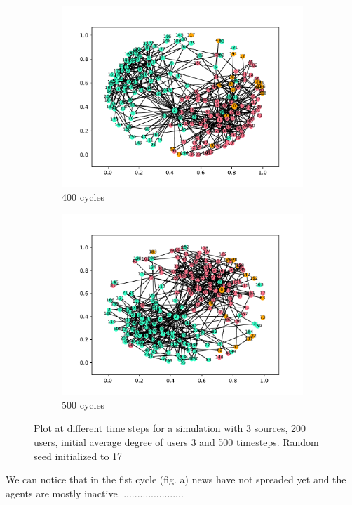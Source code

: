 \begin{figure}
  \begin{subfigure}[t]{.45\textwidth}
    \centering
    \includegraphics[trim={1cm .5cm 1cm 1cm}, clip, width=\linewidth]{img/pdf/plot-0400.pdf} 
    \caption{400 cycles} \label{fig:300}
  \end{subfigure}
  \begin{subfigure}[t]{.45\textwidth}
    \centering
    \includegraphics[trim={1cm .5cm 1cm 1cm}, clip, width=\linewidth]{img/pdf/plot-0500.pdf} 
    \caption{500 cycles} \label{fig:400}
  \end{subfigure}
 
  \caption{Plot at different time steps for a simulation with 3 sources, 200 users, initial average degree of users 3 and 500 timesteps. Random seed initialized to 17}
\end{figure}


We can notice that in the fist cycle (fig. a) news have not spreaded yet and the agents are mostly inactive. ......................
